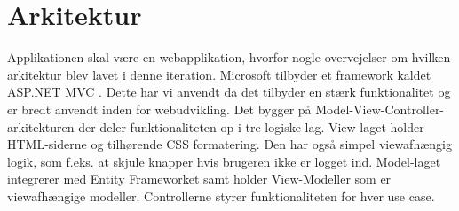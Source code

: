 \section{Arkitektur}
Applikationen skal være en webapplikation, hvorfor nogle overvejelser om hvilken arkitektur blev lavet i denne iteration.
Microsoft tilbyder et framework kaldet ASP.NET MVC \citep{aspnetmvcWeb}. Dette har vi anvendt da det tilbyder en stærk funktionalitet og er bredt anvendt inden for webudvikling. Det bygger på Model-View-Controller-arkitekturen der deler funktionaliteten op i tre logiske lag. View-laget holder HTML-siderne og tilhørende CSS formatering. Den har også simpel viewafhængig logik, som f.eks. at skjule knapper hvis brugeren ikke er logget ind. Model-laget integrerer med Entity Frameworket \citep{entityFrameworkWeb} samt holder View-Modeller som er viewafhængige modeller. Controllerne styrer funktionaliteten for hver use case.